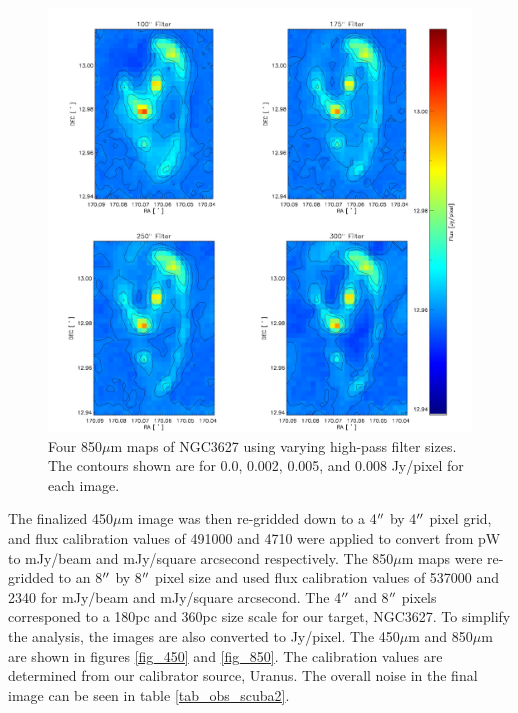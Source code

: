 \begin{figure}
  \centering
  \includegraphics[scale=0.5]{obs_imgs/850_comparison_4.jpeg}
  \caption[850$\mu$m High-Pass Filter Images]{Four 850$\mu$m maps of NGC3627 using varying high-pass filter sizes.  The contours shown are for 0.0, 0.002, 0.005, and 0.008 Jy/pixel for each image.}
  \label{fig:850_flt}
\end{figure}

The finalized 450$\mu$m image was then re-gridded down to a 4$\mbox{$^{\prime\prime}$}$ by 4$\mbox{$^{\prime\prime}$}$ pixel grid, and flux calibration values of 491000 and 4710 were applied to convert from pW to mJy/beam and mJy/square arcsecond respectively.  The 850$\mu$m maps were re-gridded to an 8$\mbox{$^{\prime\prime}$}$ by 8$\mbox{$^{\prime\prime}$}$ pixel size and used flux calibration values of 537000 and 2340 for mJy/beam and mJy/square arcsecond.  The 4$\mbox{$^{\prime\prime}$}$  and 8$\mbox{$^{\prime\prime}$}$ pixels corresponed to a 180pc and 360pc size scale for our target, NGC3627.  To simplify the analysis, the images are also converted to Jy/pixel.  The 450$\mu$m and 850$\mu$m are shown in figures \ref{fig_450} and \ref{fig_850}.  The calibration values are determined from our calibrator source, Uranus.  The overall noise in the final image can be seen in table \ref{tab_obs_scuba2}.


